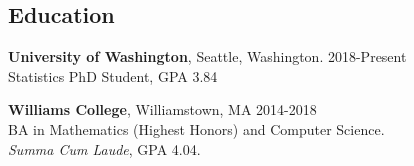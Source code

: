 \documentclass[margin, 10pt]{res} %
\begin{document}
\begin{resume}

 
 \vspace{-5mm}
\section{Education} 

{\textbf{University of Washington},} Seattle, Washington. \hfill 2018-Present \\
Statistics PhD Student, GPA 3.84 

{\textbf{Williams College}}, Williamstown, MA \hfill 2014-2018  \\
BA in Mathematics (Highest Honors) and Computer Science. \\ 
\textit{Summa Cum Laude}, GPA 4.04. 
 
 

\end{resume}
\end{document}
